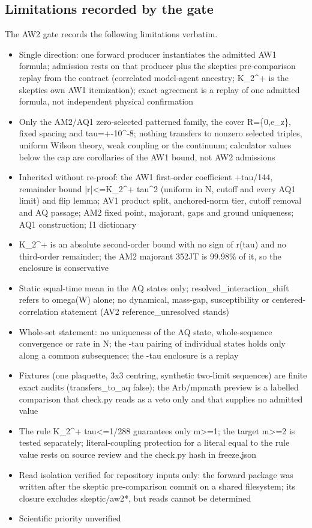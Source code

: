 \subsection{Limitations recorded by the gate}
\label{sec:aw2-limits}
The AW2 gate records the following limitations verbatim.
\begin{gatequote}
\begin{itemize}
\item Single direction: one forward producer instantiates the admitted AW1
formula; admission rests on that producer plus the skeptic\textquotesingle{}s
pre-comparison replay from the contract (correlated model-agent ancestry;
K\_2\textasciicircum{}+ is the skeptic\textquotesingle{}s own AW1
itemization); exact agreement is a replay of one admitted formula, not
independent physical confirmation
\item Only the AM2/AQ1 zero-selected patterned family, the cover R=\{0,e\_z\},
fixed spacing and tau=+-10\textasciicircum{}-8; nothing transfers to nonzero
selected triples, uniform Wilson theory, weak coupling or the continuum;
calculator values below the cap are corollaries of the AW1 bound, not AW2
admissions
\item Inherited without re-proof: the AW1 first-order coefficient +tau/144,
remainder bound |r|<=K\_2\textasciicircum{}+ tau\textasciicircum{}2 (uniform
in N, cutoff and every AQ1 limit) and flip lemma; AV1 product split,
anchored-norm tier, cutoff removal and AQ passage; AM2 fixed point, majorant,
gaps and ground uniqueness; AQ1 construction; I1 dictionary
\item K\_2\textasciicircum{}+ is an absolute second-order bound with no sign
of r(tau) and no third-order remainder; the AM2 majorant 352JT is 99.98\% of
it, so the enclosure is conservative
\item Static equal-time mean in the AQ states only;
resolved\_interaction\_shift refers to omega(W) alone; no dynamical, mass-gap,
susceptibility or centered-correlation statement (AV2 reference\_unresolved
stands)
\item Whole-set statement: no uniqueness of the AQ state, whole-sequence
convergence or rate in N; the -tau pairing of individual states holds only
along a common subsequence; the -tau enclosure is a replay
\item Fixtures (one plaquette, 3x3 centring, synthetic two-limit sequences)
are finite exact audits (transfers\_to\_aq false); the Arb/mpmath preview is a
labelled comparison that check.py reads as a veto only and that supplies no
admitted value
\item The rule K\_2\textasciicircum{}+ tau<=1/288 guarantees only m>=1; the
target m>=2 is tested separately; literal-coupling protection for a literal
equal to the rule value rests on source review and the check.py hash in
freeze.json
\item Read isolation verified for repository inputs only: the forward package
was written after the skeptic pre-comparison commit on a shared filesystem;
its closure excludes skeptic/aw2*, but reads cannot be determined
\item Scientific priority unverified
\end{itemize}
\end{gatequote}

